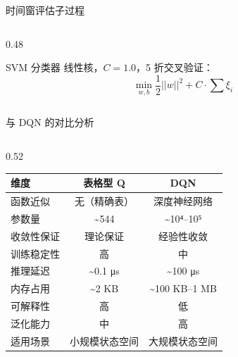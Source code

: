 \begin{frame}{时间窗评估子过程}
\begin{columns}[T]
        \begin{column}{0.48\textwidth}
            \begin{exampleblock}{\normalsize SVM 分类器}
                \footnotesize
                线性核，$C = 1.0$，5 折交叉验证：
                $$\min_{w,b} \frac{1}{2}||w||^2 + C \cdot \sum \xi_i$$
            \end{exampleblock}
        \end{column}
    \end{columns}
\end{frame}

\begin{frame}{与 DQN 的对比分析}
    \begin{columns}[t]
        \begin{column}{0.52\textwidth}
            \begin{table}
                \centering
                \footnotesize
                \begin{tabular}{lcc}
                    \toprule
                    \textbf{维度} & \textbf{表格型 Q} & \textbf{DQN} \\
                    \midrule
                    函数近似 & 无（精确表） & 深度神经网络 \\
                    \rowcolor{lightblue}
                    参数量 & \textasciitilde544 & \textasciitilde10⁴–10⁵ \\
                    收敛性保证 & \textcolor{accentgreen}{理论保证} & 经验性收敛 \\
                    \rowcolor{lightblue}
                    训练稳定性 & \textcolor{accentgreen}{高} & 中 \\
                    推理延迟 & \textcolor{accentgreen}{\textasciitilde0.1 μs} & \textasciitilde100 μs \\
                    \rowcolor{lightblue}
                    内存占用 & \textcolor{accentgreen}{\textasciitilde2 KB} & \textasciitilde100 KB–1 MB \\
                    可解释性 & \textcolor{accentgreen}{高} & 低 \\
                    \rowcolor{lightblue}
                    泛化能力 & 中 & \textcolor{accentgreen}{高} \\
                    适用场景 & \textcolor{accentgreen}{小规模状态空间} & 大规模状态空间 \\
                    \bottomrule
                \end{tabular}
            \end{table}
        \end{column}


\end{columns}
\end{frame}
